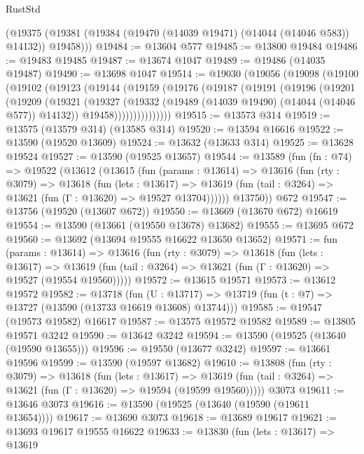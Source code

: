 \begin{lexlean}{RustStd}
\begin{coremodule}
      (@19375 (@19381 (@19384 (@19470 (@14039 @19471) (@14044 (@14046 @583)) @14132)) @19458)))
@19484 := @13604 @577
@19485 := @13800 @19484
@19486 := @19483 @19485
@19487 := @13674 @1047
@19489 := @19486 (@14035 @19487)
@19490 := @13698 @1047
@19514 := @19030
    (@19056
      (@19098
        (@19100
          (@19102
            (@19123
              (@19144
                (@19159
                  (@19176
                    (@19187
                      (@19191
                        (@19196
                          (@19201
                            (@19209
                              (@19321
                                (@19327
                                  (@19332 (@19489 (@14039 @19490) (@14044 (@14046 @577)) @14132))
                                  @19458)))))))))))))))
@19515 := @13573 @314
@19519 := @13575 (@13579 @314) (@13585 @314)
@19520 := @13594 @16616
@19522 := @13590 (@19520 @13609)
@19524 := @13632 (@13633 @314)
@19525 := @13628 @19524
@19527 := @13590 (@19525 @13657)
@19544 := @13589
    (fun (fn : @74) =>
    @19522
      (@13612
        (@13615
          (fun (params : @13614) =>
          @13616
            (fun (rty : @3079) =>
            @13618
              (fun (lets : @13617) =>
              @13619 (fun (tail : @3264) => @13621 (fun (Γ : @13620) => @19527 @13704))))))
        @13750))
    @672
@19547 := @13756 (@19520 (@13607 @672))
@19550 := @13669 (@13670 @672) @16619
@19554 := @13590 (@13661 (@19550 @13678) @13682)
@19555 := @13695 @672
@19560 := @13692 (@13694 @19555 @16622 @13650 @13652)
@19571 := fun (params : @13614) =>
  @13616
    (fun (rty : @3079) =>
    @13618
      (fun (lets : @13617) =>
      @13619 (fun (tail : @3264) => @13621 (fun (Γ : @13620) => @19527 (@19554 @19560)))))
@19572 := @13615 @19571
@19573 := @13612 @19572
@19582 := @13718
    (fun (U : @13717) => @13719 (fun (t : @7) => @13727 (@13590 (@13733 @16619 @13608) @13744)))
@19585 := @19547 (@19573 @19582) @16617
@19587 := @13575 @19572 @19582
@19589 := @13805 @19571 @3242
@19590 := @13642 @3242
@19594 := @13590 (@19525 (@13640 (@19590 @13655)))
@19596 := @19550 (@13677 @3242)
@19597 := @13661 @19596
@19599 := @13590 (@19597 @13682)
@19610 := @13808
    (fun (rty : @3079) =>
    @13618
      (fun (lets : @13617) =>
      @13619 (fun (tail : @3264) => @13621 (fun (Γ : @13620) => @19594 (@19599 @19560)))))
    @3073
@19611 := @13646 @3073
@19616 := @13590 (@19525 (@13640 (@19590 (@19611 @13654))))
@19617 := @13690 @3073
@19618 := @13689 @19617
@19621 := @13693 @19617 @19555 @16622
@19633 := @13830
    (fun (lets : @13617) =>
    @13619

\end{coremodule}
\end{lexlean}
